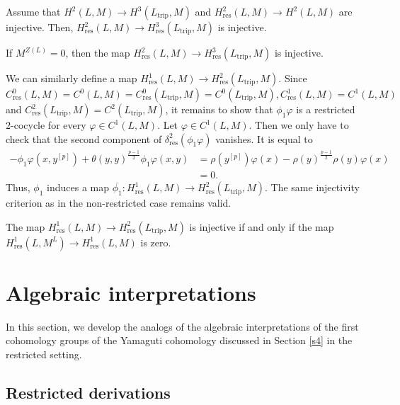 \documentclass[11pt, twoside]{article}
\begin{document}
\begin{thm}
    Assume that $H^2(L,M)\to H^3(L_\mathrm{trip},M) $ and $H^2_\mathrm{res}(L,M)\to H^2(L,M) $ are injective. Then, $H^2_\mathrm{res}(L,M)\to H^3_\mathrm{res}(L_\mathrm{trip},M) $ is injective.
\end{thm}

\begin{cor}
     If $M^{Z(L)}=0 $, then the map $H_\mathrm{res}^2(L,M)\to H_\mathrm{res}^3(L_\mathrm{trip},M) $ is injective.
\end{cor}

We can similarly define a map $H^1_\mathrm{res}(L,M)\to H^2_\mathrm{res}(L_\mathrm{trip},M)$. Since $C_\mathrm{res}^0(L,M)=C^0(L,M)=C_\mathrm{res}^0(L_\mathrm{trip},M)=C^0(L_\mathrm{trip},M) , C^1_\mathrm{res}(L,M)=C^1(L,M)$ and $C^2_\mathrm{res}(L_\mathrm{trip},M)=C^2(L_\mathrm{trip},M) $, it remains to show that $\phi_1\varphi $ is a restricted $2$-cocycle for every $\varphi\in C^1(L,M) $. Let $\varphi\in C^1(L,M) $. Then we only have to check that the second component of $\delta^2_\mathrm{res}(\phi_1\varphi) $ vanishes. It is equal to \begin{align*}
        -\phi_1\varphi(x,y^{[p]})+\theta(y,y)^\frac{p-1}{2}\phi_1\varphi(x,y)&= \rho(y^{[p]})\varphi(x) - \rho(y)^\frac{p-1}{2}\rho(y)\varphi(x)\\ &= 0.
 \end{align*} Thus, $\phi_1 $ induces a map $\overline{\phi_1}:H^1_\mathrm{res}(L,M)\to H^2_\mathrm{res}(L_\mathrm{trip},M) $. The same injectivity criterion as in the non-restricted case remains valid.

\begin{prop}
    The map $H_\mathrm{res}^1(L,M)\to H_\mathrm{res}^2(L_\mathrm{trip},M)$ is injective if and only if the map $H_\mathrm{res}^1(L,M^L)\to H_\mathrm{res}^1(L,M) $ is zero.
\end{prop}




\section{Algebraic interpretations}\label{s6}

In this section, we develop the analogs of the algebraic interpretations of the first cohomology groups of the Yamaguti cohomology discussed in Section \eqref{s4} in the restricted setting. 

\subsection{Restricted derivations}
\end{document}
